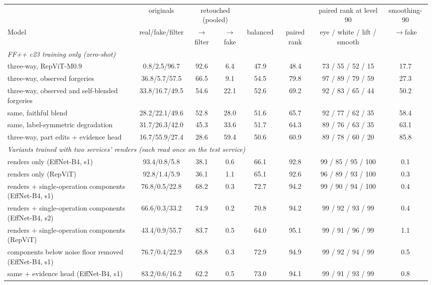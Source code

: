 \begin{tabular}{l c cc c c c c}
\toprule
 & originals & \multicolumn{2}{c}{retouched (pooled)} & & & paired rank at level 90 & smoothing-90 \\
\cmidrule(lr){3-4}
Model & real/fake/filter & $\to$filter & $\to$fake & balanced & paired rank & eye / white / lift / smooth & $\to$fake \\
\midrule
\multicolumn{8}{l}{\textit{FF++ c23 training only (zero-shot)}} \\
three-way, RepViT-M0.9 & 0.8/2.5/96.7 & 92.6 & 6.4 & 47.9 & 48.4 & 73 / 55 / 52 / 15 & 17.7 \\
three-way, observed forgeries & 36.8/5.7/57.5 & 66.5 & 9.1 & 54.5 & 79.8 & 97 / 89 / 79 / 59 & 27.3 \\
three-way, observed and self-blended forgeries & 33.8/16.7/49.5 & 54.6 & 22.1 & 52.6 & 69.2 & 92 / 83 / 65 / 44 & 50.2 \\
same, faithful blend & 28.2/22.1/49.6 & 52.8 & 28.0 & 51.6 & 65.7 & 92 / 77 / 62 / 35 & 58.4 \\
same, label-symmetric degradation & 31.7/26.3/42.0 & 45.3 & 33.6 & 51.7 & 64.3 & 89 / 76 / 63 / 35 & 63.1 \\
three-way, part edits + evidence head & 16.7/55.9/27.4 & 28.6 & 59.4 & 50.6 & 60.9 & 89 / 78 / 60 / 20 & 85.8 \\
\midrule
\multicolumn{8}{l}{\textit{Variants trained with two services' renders (each read once on the test service)}} \\
renders only (EffNet-B4, s1) & 93.4/0.8/5.8 & 38.1 & 0.6 & 66.1 & 92.8 & 99 / 85 / 95 / 100 & 0.1 \\
renders only (RepViT) & 92.8/1.4/5.9 & 36.1 & 1.1 & 65.1 & 92.6 & 96 / 89 / 93 / 100 & 0.3 \\
renders + single-operation components (EffNet-B4, s1) & 76.8/0.5/22.8 & 68.2 & 0.3 & 72.7 & 94.2 & 99 / 90 / 94 / 100 & 0.4 \\
renders + single-operation components (EffNet-B4, s2) & 66.6/0.3/33.2 & 74.9 & 0.2 & 70.8 & 94.2 & 99 / 92 / 93 / 99 & 0.4 \\
renders + single-operation components (RepViT) & 43.4/0.9/55.7 & 83.7 & 0.5 & 64.0 & 95.1 & 99 / 91 / 96 / 99 & 1.1 \\
components below noise floor removed (EffNet-B4, s1) & 76.7/0.4/22.9 & 68.8 & 0.3 & 72.9 & 94.9 & 99 / 92 / 94 / 99 & 0.5 \\
same + evidence head (EffNet-B4, s1) & 83.2/0.6/16.2 & 62.2 & 0.5 & 73.0 & 94.1 & 99 / 91 / 93 / 99 & 0.8 \\

\end{tabular}
